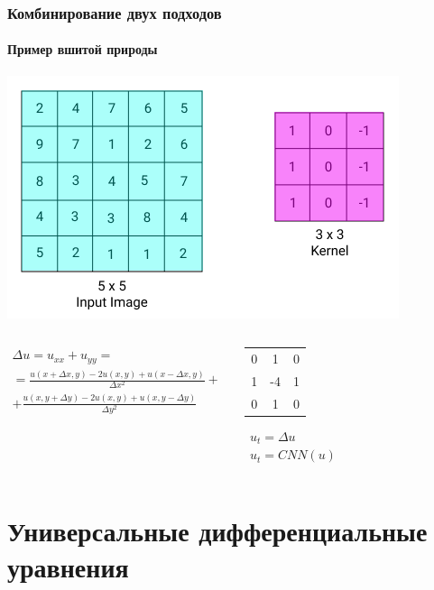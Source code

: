 \documentclass[10pt,pdf,hyperref={unicode}]{beamer}
\begin{document}
		\begin{frame}
			\frametitle{Комбинирование двух подходов} 
			\framesubtitle{Пример вшитой природы}
			\begin{center}
				\includegraphics[width=0.45\linewidth]{cnn.png}
			\end{center}
				\begin{columns}
					\begin{displaymath}
						\begin{gathered}
							\Delta u = u_{xx} + u_{yy} = \\
							= \frac{u(x+\Delta x,y) - 2u(x,y) + u(x-\Delta x, 	y)}{\Delta x^2} + \\
							+\frac{u(x,y + \Delta y) - 2u(x,y) + u(x, y - \Delta y)}{\Delta y^2}
						\end{gathered}
					\end{displaymath}
					\begin{center}
						\begin{tabular}{ c c c }
							0 & 1 & 0 \\ 
							1 & -4 & 1 \\  
							0 & 1 & 0
						\end{tabular}
					\begin{displaymath}
						\begin{gathered}
							u_t = \Delta u \\
							u_t = CNN(u)
						\end{gathered}
					\end{displaymath}
					\end{center}
				\end{columns}
		\end{frame}
		
				
	\section{Универсальные дифференциальные уравнения}
	
\end{document}
